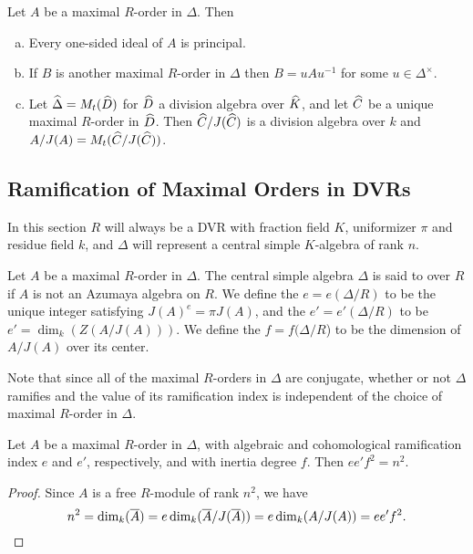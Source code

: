 \begin{thm}
Let $A$ be a maximal $R$-order in $\Delta$.  Then
\begin{enumerate}[(a)]
\item  Every one-sided ideal of $A$ is principal.
\item  If $B$ is another maximal $R$-order in $\Delta$ then $B = uAu^{-1}$ for some $u\in \Delta^\times$.
\item  Let $\widehat\Delta = M_t(\widehat D)$ for $\widehat D$ a division algebra over $\widehat K$, and let $\widehat C$ be a unique maximal $R$-order in $\widehat D$.  Then $\widehat C/J(\widehat C)$ is a division algebra over $k$ and $A/J(A) = M_t(\widehat C/J(\widehat C))$.
\end{enumerate}
\end{thm}

\subsection{Ramification of Maximal Orders in DVRs}
In this section $R$ will always be a DVR with fraction field $K$, uniformizer $\pi$ and residue field $k$, and $\Delta$ will represent a central simple $K$-algebra of rank $n$.
\begin{defn}
Let $A$ be a maximal $R$-order in $\Delta$.  The central simple algebra $\Delta$ is said to  over $R$ if $A$ is not an Azumaya algebra on $R$.  We define the  $e = e(\Delta/R)$ to be the unique integer satisfying $J(A)^e = \pi J(A)$, and the  $e' = e'(\Delta/R)$ to be $e' = \dim_k(Z(A/J(A)))$.  We define the  $f = f(\Delta/R$) to be the dimension of $A/J(A)$ over its center.
\end{defn}

Note that since all of the maximal $R$-orders in $\Delta$ are conjugate, whether or not $\Delta$ ramifies and the value of its ramification index is independent of the choice of maximal $R$-order in $\Delta$.
\begin{lem}
Let $A$ be a maximal $R$-order in $\Delta$, with algebraic and cohomological ramification index $e$ and $e'$, respectively, and with inertia degree $f$.  Then $ee'f^2 = n^2$.
\end{lem}
\begin{proof}
Since $A$ is a free $R$-module of rank $n^2$, we have
$$n^2 = \dim_{k}(\overline{A}) = e\dim_{k}(\overline{A}/J(\overline{A})) = e\dim_k(A/J(A)) = ee'f^2.$$
\end{proof}

